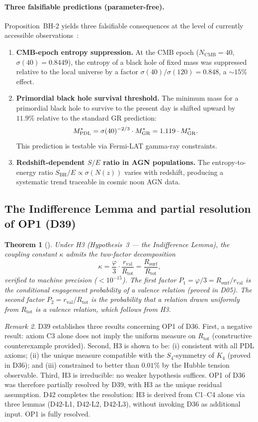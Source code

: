 \documentclass[11pt,a4paper]{article}
\theoremstyle{plain}
\newtheorem{theorem}{Theorem}[section]
\theoremstyle{definition}
\theoremstyle{remark}
\newtheorem{remark}[theorem]{Remark}
\newcommand{\PDL}{\textnormal{PDL}}
\newcommand{\Kfour}{K_4}
\newcommand{\rval}{r_{\mathrm{val}}}
\newcommand{\Rsurf}{R_{\mathrm{surf}}}
\newcommand{\Rtot}{R_{\mathrm{tot}}}
\newcommand{\SBH}{S_{\mathrm{BH}}}
\begin{document}
\paragraph{Three falsifiable predictions (parameter-free).}
Proposition~BH-2 yields three falsifiable consequences at the level of currently accessible observations~\citep{D38}:
\begin{enumerate}
\item \textbf{CMB-epoch entropy suppression.} At the CMB epoch ($N_{\mathrm{CMB}}=40$, $\sigma(40)=0.8449$), the entropy of a black hole of fixed mass was suppressed relative to the local universe by a factor $\sigma(40)/\sigma(120)=0.848$, a $\sim 15\%$ effect.
\item \textbf{Primordial black hole survival threshold.} The minimum mass for a primordial black hole to survive to the present day is shifted upward by $11.9\%$ relative to the standard GR prediction:
\[
M^*_{\PDL} = \sigma(40)^{-2/3}\cdot M^*_{\mathrm{GR}} = 1.119\cdot M^*_{\mathrm{GR}}.
\]
This prediction is testable via Fermi-LAT gamma-ray constraints.
\item \textbf{Redshift-dependent $S/E$ ratio in AGN populations.} The entropy-to-energy ratio $\SBH/E \propto \sigma(N(z))$ varies with redshift, producing a systematic trend traceable in cosmic noon AGN data.
\end{enumerate}

\subsection{The Indifference Lemma and partial resolution of OP1 (D39)}
\label{subsec:d39}

\begin{theorem}[\citep{D39}]
\label{thm:D39}
Under H3 (Hypothesis~3 — the Indifference Lemma), the coupling constant $\kappa$ admits the two-factor decomposition
\[
\kappa = \frac{\varphi}{3}\cdot\frac{\rval}{\Rtot} = \frac{\Rsurf}{\Rtot},
\]
verified to machine precision ($<10^{-15}$).
The first factor $P_1 = \varphi/3 = \Rsurf/\rval$ is the conditional engagement probability of a valence relation (proved in D05).
The second factor $P_2 = \rval/\Rtot$ is the probability that a relation drawn uniformly from $\Rtot$ is a valence relation, which follows from H3.
\end{theorem}

\begin{remark}
D39 establishes three results concerning OP1 of D36.
First, a negative result: axiom C3 alone does not imply the uniform measure on $\Rtot$ (constructive counterexample provided).
Second, H3 is shown to be: (i) consistent with all PDL axioms; (ii) the unique measure compatible with the $S_4$-symmetry of $\Kfour$ (proved in D36); and (iii) constrained to better than $0.01\%$ by the Hubble tension observable.
Third, H3 is irreducible: no weaker hypothesis suffices.
OP1 of D36 was therefore partially resolved by D39, with H3 as the unique residual assumption.
D42 completes the resolution: H3 is derived from C1--C4 alone via three lemmas (D42-L1, D42-L2, D42-L3), without invoking D36 as additional input. OP1 is fully resolved.
\end{remark}
\end{document}
